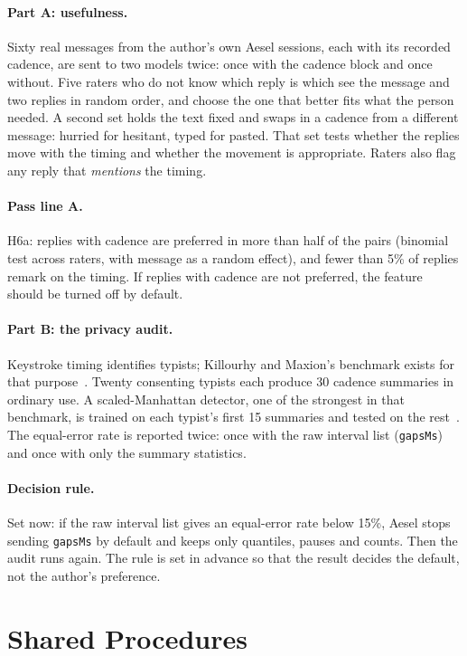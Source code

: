 \documentclass[10pt,letterpaper,twocolumn]{article}
\newcommand{\code}[1]{\texttt{#1}}
\begin{document}
\paragraph{Part A: usefulness.} Sixty real messages from the author's own Aesel sessions, each with its recorded cadence, are sent to two models twice: once with the cadence block and once without. Five raters who do not know which reply is which see the message and two replies in random order, and choose the one that better fits what the person needed. A second set holds the text fixed and swaps in a cadence from a different message: hurried for hesitant, typed for pasted. That set tests whether the replies move with the timing and whether the movement is appropriate. Raters also flag any reply that \emph{mentions} the timing.

\paragraph{Pass line A.} H6a: replies with cadence are preferred in more than half of the pairs (binomial test across raters, with message as a random effect), and fewer than 5\% of replies remark on the timing. If replies with cadence are not preferred, the feature should be turned off by default.

\paragraph{Part B: the privacy audit.} Keystroke timing identifies typists; Killourhy and Maxion's benchmark exists for that purpose~\citep{killourhy2009comparing}. Twenty consenting typists each produce 30 cadence summaries in ordinary use. A scaled-Manhattan detector, one of the strongest in that benchmark, is trained on each typist's first 15 summaries and tested on the rest~\citep{killourhy2009comparing}. The equal-error rate is reported twice: once with the raw interval list (\code{gapsMs}) and once with only the summary statistics.

\paragraph{Decision rule.} Set now: if the raw interval list gives an equal-error rate below 15\%, Aesel stops sending \code{gapsMs} by default and keeps only quantiles, pauses and counts. Then the audit runs again. The rule is set in advance so that the result decides the default, not the author's preference.

\section{Shared Procedures}
\end{document}
